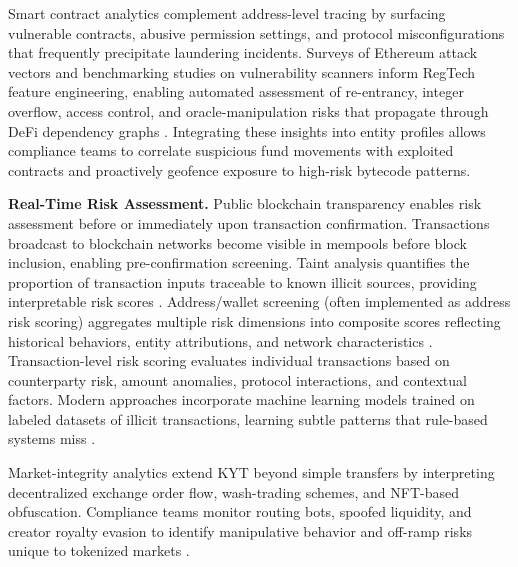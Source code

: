 Smart contract analytics complement address-level tracing by surfacing vulnerable contracts, abusive permission settings, and protocol misconfigurations that frequently precipitate laundering incidents. Surveys of Ethereum attack vectors and benchmarking studies on vulnerability scanners inform RegTech feature engineering, enabling automated assessment of re-entrancy, integer overflow, access control, and oracle-manipulation risks that propagate through DeFi dependency graphs \cite{atzei2017surveyattacksethereum,baets2024vulnerabilitydetectionsmart}. Integrating these insights into entity profiles allows compliance teams to correlate suspicious fund movements with exploited contracts and proactively geofence exposure to high-risk bytecode patterns.

\noindent\textbf{Real-Time Risk Assessment.}
Public blockchain transparency enables risk assessment before or immediately upon transaction confirmation. Transactions broadcast to blockchain networks become visible in mempools before block inclusion, enabling pre-confirmation screening. Taint analysis quantifies the proportion of transaction inputs traceable to known illicit sources, providing interpretable risk scores \cite{moser2013inquirymoneylaundering,moser2014riskscoringbitcoin}. Address/wallet screening (often implemented as address risk scoring) aggregates multiple risk dimensions into composite scores reflecting historical behaviors, entity attributions, and network characteristics \cite{weber2019antimoneylaunderingbitcoin,pocher2023detectinganomalouscryptocurrency}. Transaction-level risk scoring evaluates individual transactions based on counterparty risk, amount anomalies, protocol interactions, and contextual factors. Modern approaches incorporate machine learning models trained on labeled datasets of illicit transactions, learning subtle patterns that rule-based systems miss \cite{alarab2020comparativeanalysisusing,lorenz2020machinelearningmethods,alotibi2022moneylaunderingdetection}.

Market-integrity analytics extend KYT beyond simple transfers by interpreting decentralized exchange order flow, wash-trading schemes, and NFT-based obfuscation. Compliance teams monitor routing bots, spoofed liquidity, and creator royalty evasion to identify manipulative behavior and off-ramp risks unique to tokenized markets \cite{victor2021detectingquantifyingwash,wang2021nonfungibletokennft}.

